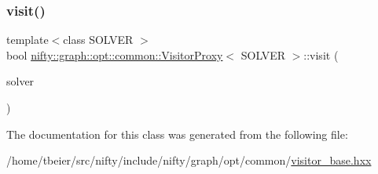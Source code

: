 \subsubsection{\texorpdfstring{visit()}{visit()}}
{\footnotesize\ttfamily template$<$class S\+O\+L\+V\+ER $>$ \\
bool \hyperlink{classnifty_1_1graph_1_1opt_1_1common_1_1VisitorProxy}{nifty\+::graph\+::opt\+::common\+::\+Visitor\+Proxy}$<$ S\+O\+L\+V\+ER $>$\+::visit (\begin{DoxyParamCaption}\item[{\hyperlink{classnifty_1_1graph_1_1opt_1_1common_1_1VisitorProxy_adf9a1e3e32a8a5ed163501888a817eff}{Solver\+Type} $\ast$}]{solver }\end{DoxyParamCaption})\hspace{0.3cm}{\ttfamily [inline]}}



The documentation for this class was generated from the following file\+:\begin{DoxyCompactItemize}
\item 
/home/tbeier/src/nifty/include/nifty/graph/opt/common/\hyperlink{visitor__base_8hxx}{visitor\+\_\+base.\+hxx}\end{DoxyCompactItemize}
